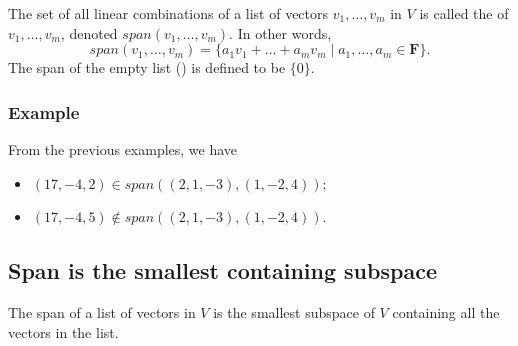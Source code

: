 \documentclass[11pt]{article}
\begin{document}
    The set of all linear combinations of a list of vectors \(v_1, \dots, v_m\) in $V$ is called the  of \(v_1, \dots, v_m\), denoted \(span(v_1,\dots,v_m)\). In other words, \[span(v_1,\dots,v_m) = \{a_1v_1 + \dots + a_m v_m \mid a_1, \dots, a_m \in \textbf{F}\}.\] The span of the empty list () is defined to be \(\{0\}\).

    \subsubsection{Example}

    From the previous examples, we have
    \begin{itemize}
        \item \((17,-4,2) \in span((2,1,-3),(1,-2,4));\)
        \item \((17,-4,5) \notin span((2,1,-3),(1,-2,4)).\)
    \end{itemize}

    \subsection{Span is the smallest containing subspace}

    The span of a list of vectors in $V$ is the smallest subspace of $V$ containing all the vectors in the list.
\end{document}
